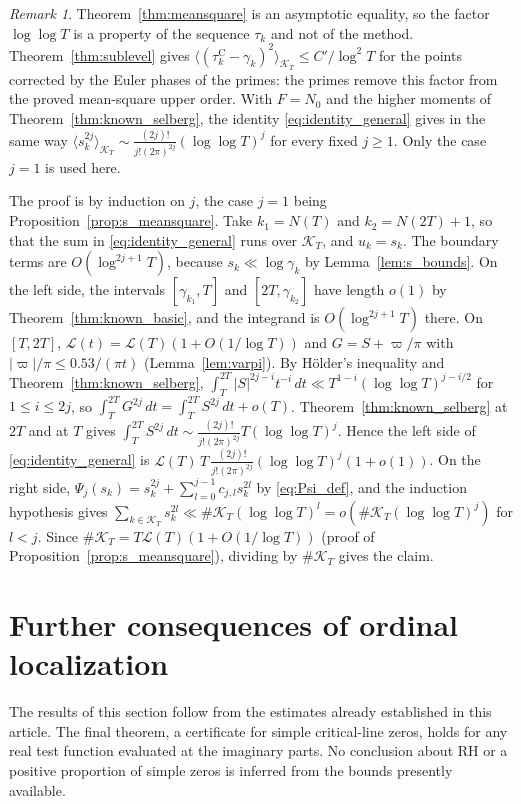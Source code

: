 \documentclass[11pt,a4paper]{article}
\makeatletter
\numberwithin{equation}{section}
\DeclareRobustCommand{\CGref}[1]{\ref{#1}}
\DeclareRobustCommand{\CGeqref}[1]{\eqref{#1}}
\let\CG@origref\ref
\let\CG@origeqref\eqref
\newcommand{\CG@gettip}[1]{\@ifundefined{CGTip@#1}{#1}{\csname CGTip@#1\endcsname}}
\DeclareRobustCommand{\CGref}[1]{\pdftooltip{\CG@origref{#1}}{\CG@gettip{#1}}}
\DeclareRobustCommand{\CGeqref}[1]{\pdftooltip{\CG@origeqref{#1}}{\CG@gettip{#1}}}
\theoremstyle{definition}
\theoremstyle{remark}
\newtheorem{remark}[theorem]{Remark}
\newcommand{\Nz}{N_0} %
\newcommand{\lL}{\mathcal L}
\newcommand{\Kc}{\mathcal K}
\makeatother
\begin{document}
\begin{remark}\label{rem:meansquare_comparison}
Theorem~\CGref{thm:meansquare} is an asymptotic equality, so the factor $\log\log T$ is a property of the sequence $\tau_k$ and not of the method. Theorem~\CGref{thm:sublevel} gives $\langle(\tau_{k}^{\mathrm C}-\gamma_k)^2\rangle_{\Kc_T}\le C'/\log^2T$ for the points corrected by the Euler phases of the primes: the primes remove this factor from the proved mean-square upper order. With $F=\Nz$ and the higher moments of Theorem~\CGref{thm:known_selberg}, the identity \CGeqref{eq:identity_general} gives in the same way $\langle s_k^{2j}\rangle_{\Kc_T}\sim\frac{(2j)!}{j!(2\pi)^{2j}}(\log\log T)^j$ for every fixed $j\ge1$. Only the case $j=1$ is used here.

The proof is by induction on $j$, the case $j=1$ being Proposition~\CGref{prop:s_meansquare}. Take $k_1=N(T)$ and $k_2=N(2T)+1$, so that the sum in \CGeqref{eq:identity_general} runs over $\Kc_T$, and $u_k=s_k$. The boundary terms are $O(\log^{2j+1}T)$, because $s_k\ll\log\gamma_k$ by Lemma~\CGref{lem:s_bounds}. On the left side, the intervals $[\gamma_{k_1},T]$ and $[2T,\gamma_{k_2}]$ have length $o(1)$ by Theorem~\CGref{thm:known_basic}, and the integrand is $O(\log^{2j+1}T)$ there. On $[T,2T]$, $\lL(t)=\lL(T)(1+O(1/\log T))$ and $G=S+\varpi/\pi$ with $|\varpi|/\pi\le0.53/(\pi t)$ (Lemma~\CGref{lem:varpi}). By Hölder's inequality and Theorem~\CGref{thm:known_selberg}, $\int_T^{2T}|S|^{2j-i}t^{-i}\,dt\ll T^{1-i}(\log\log T)^{j-i/2}$ for $1\le i\le2j$, so $\int_T^{2T}G^{2j}\,dt=\int_T^{2T}S^{2j}\,dt+o(T)$. Theorem~\CGref{thm:known_selberg} at $2T$ and at $T$ gives $\int_T^{2T}S^{2j}\,dt\sim\frac{(2j)!}{j!(2\pi)^{2j}}T(\log\log T)^j$. Hence the left side of \CGeqref{eq:identity_general} is $\lL(T)\,T\,\frac{(2j)!}{j!(2\pi)^{2j}}(\log\log T)^j(1+o(1))$. On the right side, $\Psi_j(s_k)=s_k^{2j}+\sum_{l=0}^{j-1}c_{j,l}s_k^{2l}$ by \CGeqref{eq:Psi_def}, and the induction hypothesis gives $\sum_{k\in\Kc_T}s_k^{2l}\ll\#\Kc_T(\log\log T)^l=o(\#\Kc_T(\log\log T)^j)$ for $l<j$. Since $\#\Kc_T=T\lL(T)(1+O(1/\log T))$ (proof of Proposition~\CGref{prop:s_meansquare}), dividing by $\#\Kc_T$ gives the claim.
\end{remark}


\section{Further consequences of ordinal localization}\label{sec:additional}
The results of this section follow from the estimates already established in this article. The final theorem, a certificate for simple critical-line zeros, holds for any real test function evaluated at the imaginary parts. No conclusion about RH or a positive proportion of simple zeros is inferred from the bounds presently available.
\end{document}
